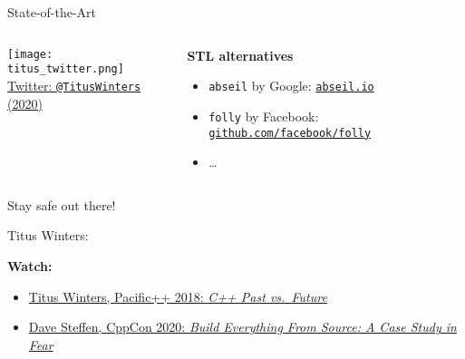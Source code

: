 \begin{frame}{State-of-the-Art}
    \begin{columns}
        \begin{column}{.4\textwidth}
            \centering
            \texttt{[image: titus\_twitter.png]}\\
            {\footnotesize \href{https://twitter.com/TitusWinters/status/1224377740306132998}{Twitter: \texttt{@TitusWinters} (2020)}}
        \end{column}
        \begin{column}{.5\textwidth}
            \textbf{STL alternatives}
            \begin{itemize}
                \item \texttt{abseil} by Google: \href{https://abseil.io}{\texttt{abseil.io}}
                \item \texttt{folly} by Facebook: \href{https://github.com/facebook/folly}{\texttt{github.com/facebook/folly}}
                \item \ldots
            \end{itemize}
        \end{column}
    \end{columns}
\end{frame}

\begin{frame}{Stay safe out there!}
    \begin{center}
        Titus Winters:\\
        \vspace{3mm}
        \vspace{2mm}
        \vspace{2mm}
    \end{center}

    \vspace{5mm}
    \textbf{Watch:}
    \begin{itemize}
        \item \href{https://youtu.be/IY8tHh2LSX4}{Titus Winters, Pacific++ 2018: \textit{C++ Past vs.\ Future}}
        \item \href{https://youtu.be/54uVTkhinDE}{Dave Steffen, CppCon 2020: \textit{Build Everything From Source: A Case Study in Fear}}
    \end{itemize}
\end{frame}

